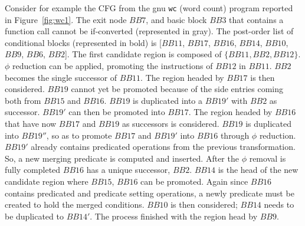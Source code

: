 Consider for example the CFG from the gnu \texttt{wc} (word count) program reported in Figure~\ref{fig:wc1}. The exit node $\textit{BB}7$, and basic block $\textit{BB}3$ that contains a function call cannot be if-converted (represented in gray). 
 The post-order list of conditional blocks (represented in bold) is [$\textit{BB}11$, $\textit{BB}17$, $\textit{BB}16$, $\textit{BB}14$, $\textit{BB}10$, $\textit{BB}9$, $\textit{BB}6$, $\textit{BB}2$]. 
The first candidate region is composed of $\{\textit{BB11}, \textit{BB}2, \textit{BB}12\}$. $\phi$ reduction can be applied, promoting the instructions of $\textit{BB}12$ in $\textit{BB}11$. $\textit{BB}2$ becomes the single successor of $\textit{BB}11$. 
%
The region headed by $\textit{BB}17$ is then considered. $\textit{BB}19$ cannot yet be promoted because of the side entries coming both from $\textit{BB}15$ and $\textit{BB}16$. $\textit{BB}19$ is duplicated into a $\textit{BB}19'$ with $\textit{BB}2$ as successor. $\textit{BB}19'$ can then be promoted into $\textit{BB}17$.
%
The region headed by $\textit{BB}16$ that have now $\textit{BB}17$ and $\textit{BB}19$ as successors is considered. $\textit{BB}19$ is duplicated into $\textit{BB}19''$, so as to promote $\textit{BB}17$ and $\textit{BB}19'$ into $\textit{BB}16$ through $\phi$ reduction. $\textit{BB}19'$ already contains predicated operations from the previous transformation. So, a new merging predicate is computed and inserted. After the $\phi$ removal is fully completed $\textit{BB}16$ has a unique successor, $\textit{BB}2$.
%
$\textit{BB}14$ is the head of the new candidate region where $\textit{BB}15$, $\textit{BB}16$ can be promoted. Again since $\textit{BB}16$ contains predicated and predicate setting operations, a newly predicate must be created to hold the merged conditions.
$\textit{BB}10$ is then considered; $\textit{BB}14$ needs to be duplicated to $\textit{BB}14'$. The process finished with the region head by $\textit{BB}9$.

